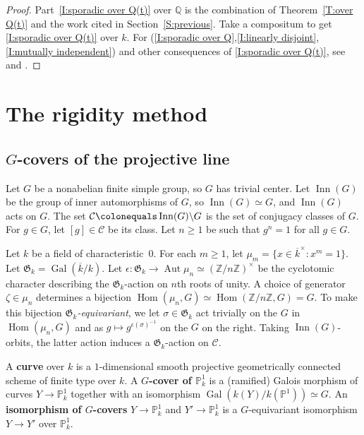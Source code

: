 \documentclass[12pt,reqno]{amsart}
\newcommand{\deficolor}{ForestGreen}
\newcommand{\defi}[1]{\textbf{\color{\deficolor} #1}} %
\newcommand{\PP}{\mathbb{P}}
\newcommand{\Q}{\mathbb{Q}}
\newcommand{\Z}{\mathbb{Z}}
\newcommand{\kbar}{{\overline{k}}}
\newcommand{\calC}{\mathcal{C}}
\newcommand{\GG}{\mathfrak{G}}
\DeclareMathOperator{\Aut}{Aut}
\DeclareMathOperator{\Gal}{Gal}
\DeclareMathOperator{\Hom}{Hom}
\DeclareMathOperator{\Inn}{Inn}
\newcommand{\isom}{\simeq}
\theoremstyle{definition}
\theoremstyle{remark}
\begin{document}
\begin{proof}
Part~\eqref{I:sporadic over Q(t)} over $\Q$ is the combination of Theorem~\ref{T:over Q(t)} and the work cited in Section~\ref{S:previous}.
Take a compositum to get \eqref{I:sporadic over Q(t)} over $k$.
For (\ref{I:sporadic over Q},\ref{I:linearly disjoint},\ref{I:mutually independent}) and other consequences of \eqref{I:sporadic over Q(t)}, see \cite[\S3.3--3.4]{Serre1992} and \cite[\S10.1]{Serre1997}.
\end{proof}


\section{The rigidity method}

\subsection{\texorpdfstring{$G$}{G}-covers of the projective line}

Let $G$ be a nonabelian finite simple group, so $G$ has trivial center.
Let $\Inn(G)$ be the group of inner automorphisms of $G$, so $\Inn(G) \isom G$, and $\Inn(G)$ acts on $G$.
The set $\calC \colonequals \Inn(G) \backslash G$ is the set of conjugacy classes of $G$.
For $g \in G$, let $[g] \in \calC$ be its class.
Let $n \ge 1$ be such that $g^n=1$ for all $g \in G$.

Let $k$ be a field of characteristic~$0$.
For each $m \ge 1$, let $\mu_m = \{x \in \kbar^\times : x^m=1\}$.
Let $\GG_k = \Gal(\kbar/k)$.
Let $\epsilon \colon \GG_k \to \Aut \mu_n \isom (\Z/n\Z)^\times$ be the cyclotomic character describing the $\GG_k$-action on $n$th roots of unity.
A choice of generator $\zeta \in \mu_n$ determines a bijection $\Hom(\mu_n,G) \isom \Hom(\Z/n\Z,G) = G$.
To make this bijection \emph{$\GG_k$-equivariant}, we let $\sigma \in \GG_k$ act trivially on the $G$ in $\Hom(\mu_n,G)$ and as $g \mapsto g^{\epsilon(\sigma)^{-1}}$ on the $G$ on the right.
Taking $\Inn(G)$-orbits, the latter action induces a $\GG_k$-action on $\calC$.

A \defi{curve} over $k$ is a $1$-dimensional smooth projective geometrically connected scheme of finite type over $k$.
A \defi{$G$-cover of $\PP^1_k$} is a (ramified) Galois morphism of curves $Y \to \PP^1_k$ together with an isomorphism $\Gal(k(Y)/k(\PP^1)) \isom G$.
An \defi{isomorphism of $G$-covers} $Y \to \PP^1_k$ and 
$Y' \to \PP^1_k$ is a $G$-equivariant isomorphism $Y \to Y'$ over $\PP^1_k$.
\end{document}
